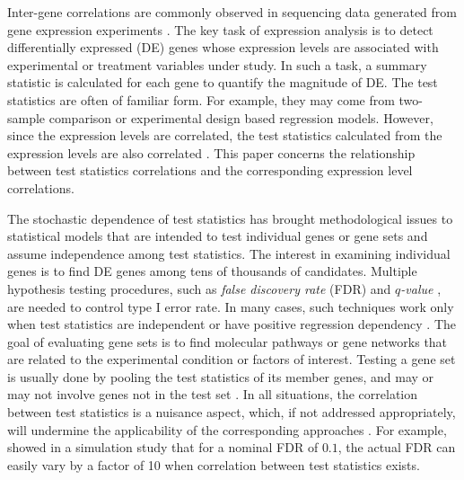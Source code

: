	Inter-gene correlations are commonly observed in sequencing data generated from gene expression 
	experiments \citep{efron2012large1, qiu2005effects,storey2003positive, huang2013gene, 
		gatti2010heading}.
	The key task of expression analysis is to detect differentially expressed (DE) genes whose 
	expression levels are associated with experimental or treatment variables under study. 
	In such a task, 
	a summary statistic is calculated for each gene to quantify the magnitude of DE. The test 
	statistics are often of familiar form. For example, 
	they may come from two-sample comparison or experimental design based regression models. 
	However, since the expression levels are correlated, the test statistics calculated from the 
	expression levels are also correlated \citep{barry2008statistical, efron2007correlation, 
		wu2012camera}. This paper concerns the relationship between test 
	statistics correlations and the corresponding expression level correlations.
	
	The stochastic dependence of test statistics has brought methodological issues to statistical 
	models that are intended to test individual genes or gene sets and assume independence among 
	test statistics. The interest in examining individual genes is to find DE genes among tens of 
	thousands of candidates. Multiple hypothesis testing 
	procedures, such as \textit{false discovery rate} (FDR) \citep{benjamini1995controlling} and 
	\textit{$q$-value} \citep{storey2003positive}, 
	are needed to control type I error rate. In many cases, such techniques work only 
	when test statistics are independent \citep{benjamini1995controlling} or 
	have positive regression dependency \citep{benjamini2001control}. The goal of evaluating gene 
	sets is to find molecular pathways or gene 
	networks that are related to the experimental condition or factors of interest. Testing a gene 
	set is usually done by pooling the test 
	statistics of its member genes, and may or may not involve genes not in the test set 
	\citep{goeman2007analyzing}. In all situations, the 
	correlation between test statistics is a nuisance aspect, which, if not addressed 
	appropriately, will undermine the applicability of the 
	corresponding approaches \citep{gatti2010heading, wu2012camera}. For
	example, \citet{efron2007correlation} showed in a simulation study that for a nominal FDR of 
	$0.1$, the actual FDR can easily vary by a factor of 10 when correlation between test 
	statistics 
	exists. 
	
